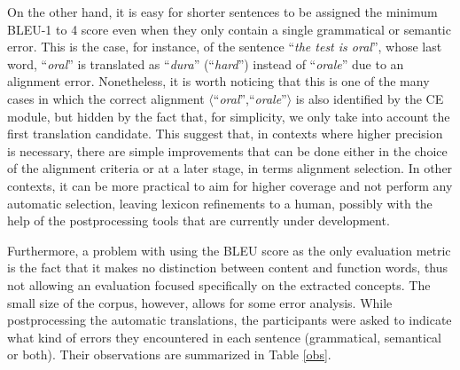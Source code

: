 \documentclass[11pt]{article}
\begin{document}
On the other hand, it is easy for shorter sentences to be assigned the minimum BLEU-1 to 4 score even when they only contain a single grammatical or semantic error. 
This is the case, for instance, of the sentence ``\textit{the test is oral}'', whose last word, ``\textit{oral}'' is translated as ``\textit{dura}'' (``\textit{hard}'') instead of ``\textit{orale}'' due to an alignment error. 
Nonetheless, it is worth noticing that this is one of the many cases in which the correct alignment $\langle$``\textit{oral}'',``\textit{orale}''$\rangle$ is also identified by the CE module, but hidden by the fact that, for simplicity, we only take into account the first translation candidate.
This suggest that, in contexts where higher precision is necessary, there are simple improvements that can be done either in the choice of the alignment criteria or at a later stage, in terms alignment selection. 
In other contexts, it can be more practical to aim for higher coverage and not perform any automatic selection, leaving lexicon refinements to a human, possibly with the help of the postprocessing tools that are currently under development.

Furthermore, a problem with using the BLEU score as the only evaluation metric is the fact that it makes no distinction between content and function words, thus not allowing an evaluation focused specifically on the extracted concepts. 
The small size of the corpus, however, allows for some error analysis. 
While postprocessing the automatic translations, the participants were asked to indicate what kind of errors they encountered in each sentence (grammatical, semantical or both). 
Their observations are summarized in Table \ref{obs}.
\end{document}
